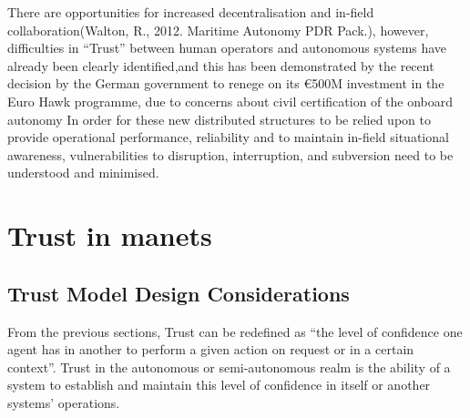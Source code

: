 There are opportunities for increased decentralisation and in-field collaboration(Walton, R., 2012. Maritime Autonomy PDR Pack.), however, difficulties in “Trust” between human operators and autonomous systems have already been clearly identified\cite{Chen2011b},and this has been demonstrated by the recent decision by the German government to renege on its €500M investment in the Euro Hawk programme, due to concerns about civil certification of the onboard autonomy\cite{Mehta2013}
In order for these new distributed structures to be relied upon to provide operational performance, reliability and to maintain in-field situational awareness, vulnerabilities to disruption, interruption, and subversion need to be understood and minimised.


\section{Trust in \glspl{manet}}

\subsection{Trust Model Design Considerations}\label{sec:trust_model_design_considerations}

From the previous sections, Trust can be redefined as ``the level of confidence one agent has in another to perform a given action on request or in a certain context''.
Trust in the autonomous or semi-autonomous realm is the ability of a system to establish and maintain this level of confidence in itself or another systems' operations.

